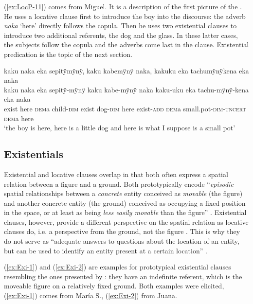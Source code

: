 (\ref{ex:LocP-11}) comes from Miguel. It is a description of the first picture of the . He uses a locative clause first to introduce the boy into the discourse: the adverb \textit{naka} ‘here’ directly follows the copula.  Then he uses two existential clauses to introduce two additional referents, the dog and the glass. In these latter cases, the subjects follow the copula and the adverbs come last in the clause. Existential predication is the topic of the next section.

\ea\label{ex:LocP-11}
\begingl
\glpreamble kaku naka eka sepitÿmÿnÿ, kaku kabemÿnÿ naka, kakuku eka tachumÿnÿkena eka naka\\
\gla kaku naka eka sepitÿ-mÿnÿ kaku kabe-mÿnÿ naka kaku-uku eka tachu-mÿnÿ-kena eka naka\\
\glb exist here \textsc{dem}a child-\textsc{dim} exist dog-\textsc{dim} here exist-\textsc{add} \textsc{dem}a small.pot-\textsc{dim}-\textsc{uncert} \textsc{dem}a here\\
\glft ‘the boy is here, here is a little dog and here is what I suppose is a small pot’
\endgl
\trailingcitation{[mox-a110920l-2.006-007]}
\xe
{}

\subsection{Existentials}\label{sec:Existentials}

Existential and locative clauses overlap in that both often express a spatial relation between a figure and a ground. Both prototypically encode “\textit{episodic} spatial relationships between a \textit{concrete} entity conceived as \textit{movable} (the figure) and another concrete entity (the ground) conceived as occupying a fixed position in the space, or at least as being \textit{less easily movable} than the figure” \citep[10]{Creissels2014a}.
 Existential clauses, however, provide a different perspective on the spatial relation as locative clauses do, i.e. a perspective from the ground, not the figure \citep[9, 18]{Creissels2014a}.
This is why they do not serve as “adequate answers to questions about the location of an entity, but can be used to identify an entity present at a certain location” \citep[2]{Creissels2014a}.

(\ref{ex:Exi-1}) and (\ref{ex:Exi-2}) are examples for prototypical existential clauses resembling the ones presented by \citet[]{Creissels2014a}: they have an indefinite referent, which is the moveable figure on a relatively fixed ground. Both examples were elicited, (\ref{ex:Exi-1}) comes from María S., (\ref{ex:Exi-2}) from Juana.

